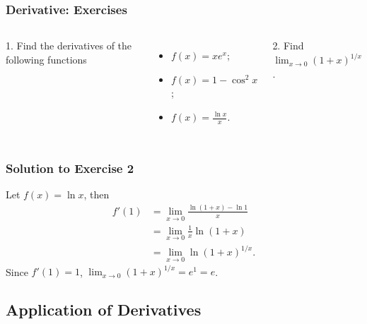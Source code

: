 \documentclass{beamer}
\begin{document}
\begin{frame}
\frametitle{Derivative: Exercises}
\begin{columns}[t] %

1. Find the derivatives of the following functions
\begin{itemize}
\item $f(x) = x e^x$;
\item $f(x) = 1 - \cos^2 x$;
\item $f(x) = \frac{\ln x}{x}$.
\end{itemize}

2. Find $\lim_{x \rightarrow 0} (1+x)^{1/x}$.

\end{columns}
\end{frame}

\begin{frame}
\frametitle{Solution to Exercise 2}
Let $f(x) = \ln x$, then
\begin{equation*}
\begin{aligned}
f'(1) &= \lim_{x \rightarrow 0} \frac{\ln (1+x) - \ln 1}{x} \\
&= \lim_{x \rightarrow 0} \frac{1}{x} \ln (1+x) \\
&= \lim_{x \rightarrow 0} \ln (1+x)^{1/x}.
\end{aligned}
\end{equation*}
Since $f'(1)=1$, $\lim_{x \rightarrow 0} (1+x)^{1/x} = e^{1} = e$.
\end{frame}


\subsection{Application of Derivatives}
\end{document}
